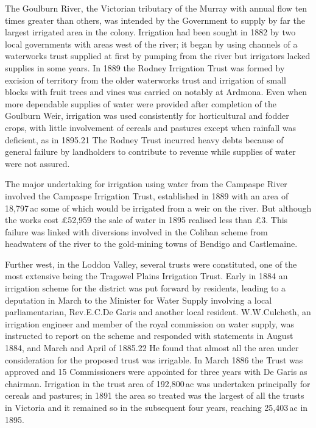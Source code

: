 The Goulburn River, the Victorian tributary of the Murray with annual
flow ten times greater than others, was intended by the Government to
supply by far the largest irrigated area in the colony. Irrigation had
been sought in 1882 by two local governments with areas west of the
river; it began by using channels of a waterworks trust supplied at
first by pumping from the river but irrigators lacked supplies in some
years. In 1889 the Rodney Irrigation Trust was formed by excision of
territory from the older waterworks trust and irrigation of small
blocks with fruit trees and vines was carried on notably at
Ardmona. Even when more dependable supplies of water were provided
after completion of the Goulburn Weir, irrigation was used
consistently for horticultural and fodder crops, with little
involvement of cereals and pastures except when rainfall was
deficient, as in 1895.21 The Rodney Trust incurred heavy debts because
of general failure by landholders to contribute to revenue while
supplies of water were not assured.

The major undertaking for irrigation using water from the Campaspe
River involved the Campaspe Irrigation Trust, established in 1889 with
an area of 18,797\,ac some of which would be irrigated from a weir on
the river. But although the works cost \pounds52,959 the sale of water
in 1895 realised less than \pounds3. This failure was linked with
diversions involved in the Coliban scheme from headwaters of the river
to the gold-mining towns of Bendigo and Castlemaine.

Further west, in the Loddon Valley, several trusts were constituted,
one of the most extensive being the Tragowel Plains Irrigation
Trust. Early in 1884 an irrigation scheme for the district was put
forward by residents, leading to a deputation in March to the Minister
for Water Supply involving a local parliamentarian, Rev.E.C.De Garis
and another local resident. W.W.Culcheth, an irrigation engineer and
member of the royal commission on water supply, was instructed to
report on the scheme and responded with statements in August 1884, and
March and April of 1885.22   He found that almost all the area under
consideration for the proposed trust was irrigable.  In March 1886 the
Trust was approved and 15 Commissioners were appointed for three years
with De Garis as chairman. Irrigation in the trust area of 192,800\,ac
was undertaken principally for cereals and pastures; in 1891 the area
so treated was the largest of all the trusts in Victoria and it
remained so in the subsequent four years, reaching 25,403\,ac in 1895.


